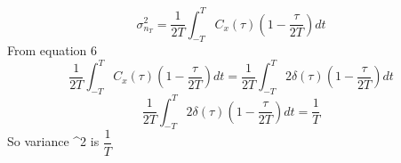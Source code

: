 \documentclass{beamer}
\begin{document}
\begin{frame}
\begin{equation*}
    \sigma^2_{n_{T}} = \frac{1}{2T}\int_{-T}^{T}C_{x}(\tau)(1 - \frac{\tau}{2T})dt
\end{equation*}
From equation 6
\begin{equation*}
    \frac{1}{2T}\int_{-T}^{T}C_{x}(\tau)(1 - \frac{\tau}{2T})dt = \frac{1}{2T}\int_{-T}^{T}2\delta(\tau)(1 - \frac{\tau}{2T})dt  
\end{equation*}
\begin{equation*}
    \frac{1}{2T}\int_{-T}^{T}2\delta(\tau)(1 - \frac{\tau}{2T})dt = \frac{1}{T}
\end{equation*}
So variance \sigma^2 is $\dfrac{1}{T}$  
\end{frame}
\end{document}
